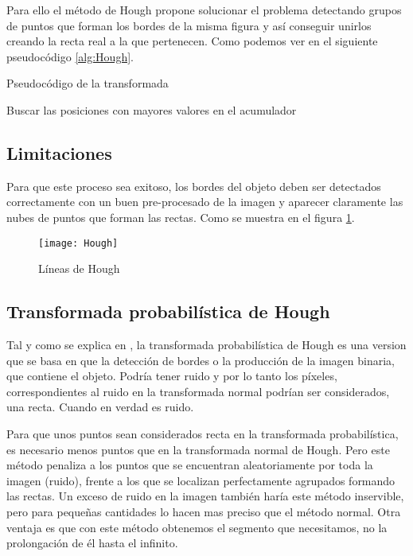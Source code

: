 Para ello el método de Hough propone solucionar el problema detectando grupos de puntos que forman los bordes de la misma figura y así conseguir unirlos creando la recta real a la que pertenecen. Como podemos ver en el siguiente pseudocódigo 
\ref{alg:Hough}.

\label{alg:Hough}
\begin{algorithm*}
\caption{Pseudocódigo de la transformada}
\DontPrintSemicolon
{}


Buscar las posiciones con mayores valores en el acumulador\;	

\end{algorithm*}

\subsection{Limitaciones}
Para que este proceso sea exitoso, los bordes del objeto deben ser detectados correctamente con un buen pre-procesado de la imagen y aparecer claramente las nubes de puntos que forman las rectas.
Como se muestra en el figura \ref{fig:3.5}.

\begin{figure}[h]
\centering
\texttt{[image: Hough]}
\caption{Líneas de Hough~\cite{opencv:HoughIm}}
\label{fig:3.5}
\end{figure}
\subsection{Transformada probabilística de Hough}

Tal y como se explica en \cite{Kiryati20001157}, la transformada probabilística de Hough es una version que se basa en que la detección de bordes o la producción de la imagen binaria, que contiene el objeto. Podría tener ruido y por lo tanto los píxeles, correspondientes al ruido en la transformada normal podrían ser considerados, una recta. Cuando en verdad es ruido.

Para que unos puntos sean considerados recta en la transformada probabilística, es necesario menos puntos que en la transformada normal de Hough.
Pero este método penaliza a los puntos que se encuentran aleatoriamente por toda la imagen (ruido), frente a los que se localizan perfectamente agrupados formando las rectas. 
Un exceso de ruido en la imagen también haría este método inservible, pero para pequeñas cantidades lo hacen mas preciso que el método normal.
Otra ventaja es que con este método obtenemos el segmento que necesitamos, no la prolongación de él hasta el infinito.

